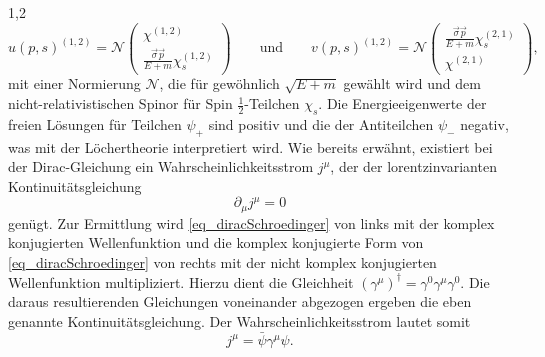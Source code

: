 \documentclass[11pt,a4paper,twoside]{report}
\begin{document}
\begin{spacing}{1,2}
\begin{equation}
 u(p,s)^{(1,2)} = \mathcal{N} \begin{pmatrix}
                          \chi^{(1,2)}\\
                          \frac{\vec \sigma \vec p}{E+m} \chi_s^{(1,2)}
                         \end{pmatrix} \qquad \text{und}\qquad v(p,s)^{(1,2)} = \mathcal{N} \begin{pmatrix}
                          \frac{\vec \sigma \vec p}{E+m} \chi_s^{(2,1)}\\
                          \chi^{(2,1)}                          
                         \end{pmatrix},
\end{equation}
mit einer Normierung $\mathcal{N}$, die für gewöhnlich $\sqrt{E + m}$ gewählt wird und dem nicht-relativistischen Spinor für Spin $\frac12$-Teilchen $\chi_s$.
Die Energieeigenwerte der freien Lösungen für Teilchen $\psi_+$ sind positiv und die der Antiteilchen $\psi_-$ negativ, was mit der Löchertheorie interpretiert
wird. Wie bereits erwähnt, existiert bei der Dirac-Gleichung ein Wahrscheinlichkeitsstrom $j^\mu$, der der lorentzinvarianten Kontinuitätsgleichung
\begin{equation}
 \partial_\mu j^\mu = 0
\end{equation}
genügt. Zur Ermittlung wird \eqref{eq_diracSchroedinger} von links mit der komplex konjugierten Wellenfunktion und die komplex konjugierte
Form von \eqref{eq_diracSchroedinger} von rechts mit der nicht komplex konjugierten Wellenfunktion multipliziert. Hierzu dient die Gleichheit 
$(\gamma^\mu)^\dagger = \gamma^0\gamma^\mu\gamma^0$. Die daraus resultierenden Gleichungen voneinander abgezogen ergeben die eben genannte Kontinuitätsgleichung.
Der Wahrscheinlichkeitsstrom lautet somit
\begin{equation}
 j^\mu = \bar \psi \gamma^\mu \psi.
 \label{eq_diracstrom}
\end{equation}



\end{spacing}
\end{document}
